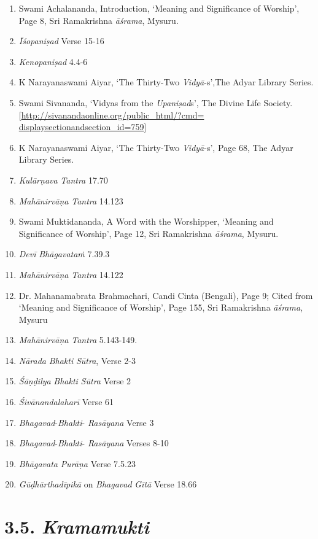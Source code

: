 \begin{enumerate}
\itemsep=0pt
\item
Swami Achalananda, Introduction, `Meaning and Significance of Worship', Page 8, Sri Ramakrishna \emph{āśrama}, Mysuru.
\item
\emph{Īśopaniṣad} Verse 15-16
\item
\emph{Kenopaniṣad} 4.4-6
\item
K Narayanaswami Aiyar, `The Thirty-Two \emph{Vidyā}-s',The Adyar Library Series.
\item
Swami Sivananda, `Vidyas from the \emph{Upaniṣad}s', The Divine Life Society. [\url{http://sivanandaonline.org/public_html/?cmd=}\break
\url{displaysectionandsection_id=759}]
\item
K Narayanaswami Aiyar, `The Thirty-Two \emph{Vidyā}-s', Page 68, The Adyar Library Series.
\item
\emph{Kulārṇava} \emph{Tantra} 17.70
\item
\emph{Mahānirvāṇa} \emph{Tantra} 14.123
\item
Swami Muktidananda, A Word with the Worshipper, `Meaning and Significance of Worship', Page 12, Sri Ramakrishna \emph{āśrama}, Mysuru.
\item
\emph{Devī} \emph{Bhāgavataṁ} 7.39.3
\item
\emph{Mahānirvāṇa} \emph{Tantra} 14.122
\item
Dr. Mahanamabrata Brahmachari, Candi Cinta (Bengali), Page 9; Cited from `Meaning and Significance of Worship', Page 155, Sri Ramakrishna \emph{āśrama}, Mysuru
\item
\emph{Mahānirvāṇa} \emph{Tantra} 5.143-149.
\item
\emph{Nārada} \emph{Bhakti} \emph{Sūtra}, Verse 2-3
\item
\emph{Śāṇḍilya} \emph{Bhakti} \emph{Sūtra} Verse 2
\item
\emph{Śivānandalaharī} Verse 61
\item
\emph{Bhagavad}-\emph{Bhakti}- \emph{Rasāyana} Verse 3
\item
\emph{Bhagavad}-\emph{Bhakti}- \emph{Rasāyana} Verses 8-10
\item
\emph{Bhāgavata} \emph{Purāṇa} Verse 7.5.23
\item
\emph{Gūḍhārthadīpikā} on \emph{Bhagavad} \emph{Gītā} Verse 18.66
\end{enumerate}
\newpage

\section*{3.5. \emph{Kramamukti}}

